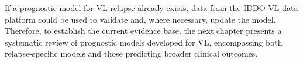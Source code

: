 If a prognostic model for VL relapse already exists, data from the IDDO VL data platform could be used to validate and, where necessary, update the model\cite{collins2024A}. Therefore, to establish the current evidence base, the next chapter presents a systematic review of prognostic models developed for VL, encompassing both relapse-specific models and those predicting broader clinical outcomes.
